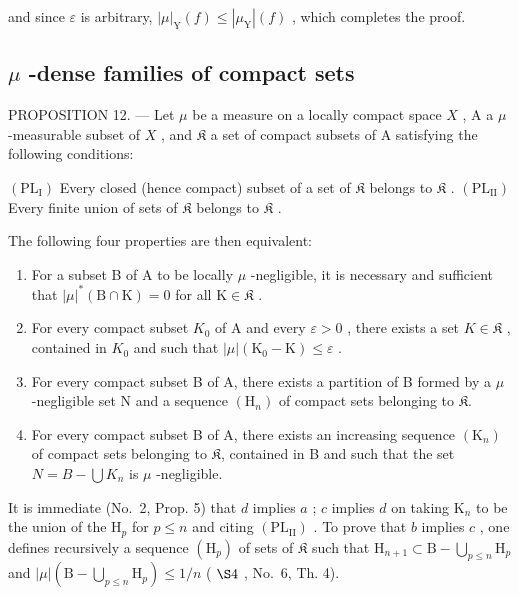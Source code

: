 and since \(\varepsilon\) is arbitrary, \(|\mu|_{\mathrm{Y}}(f) \leqslant |\mu_{\mathrm{Y}}|(f)\) , which completes the proof.

\subsection{\texorpdfstring{\(\mu\) -dense families of compact sets}{mu -dense families of compact sets}}

PROPOSITION 12. --- Let \(\mu\) be a measure on a locally compact space \(X\) , A a \(\mu\) -measurable subset of \(X\) , and \(\mathfrak{K}\) a set of compact subsets of A satisfying the following conditions:

\((\mathrm{PL}_{\mathrm{I}})\) Every closed (hence compact) subset of a set of \(\mathfrak{K}\) belongs to \(\mathfrak{K}\) . \((\mathrm{PL}_{\mathrm{II}})\) Every finite union of sets of \(\mathfrak{K}\) belongs to \(\mathfrak{K}\) .

The following four properties are then equivalent:

\begin{enumerate}
\def\labelenumi{\alph{enumi})}
\item
  For a subset B of A to be locally \(\mu\) -negligible, it is necessary and sufficient that \(|\mu|^*(\mathrm{B} \cap \mathrm{K}) = 0\) for all \(\mathrm{K} \in \mathfrak{K}\) .
\item
  For every compact subset \(K_{0}\) of A and every \(\varepsilon > 0\) , there exists a set \(K \in \mathfrak{K}\) , contained in \(K_{0}\) and such that \(|\mu|(\mathrm{K}_{0} - \mathrm{K}) \leqslant \varepsilon\) .
\item
  For every compact subset B of A, there exists a partition of B formed by a \(\mu\) -negligible set N and a sequence \((\mathrm{H}_{n})\) of compact sets belonging to \(\mathfrak{K}\).
\item
  For every compact subset B of A, there exists an increasing sequence \((\mathrm{K}_{n})\) of compact sets belonging to \(\mathfrak{K}\), contained in B and such that the set \(N = B - \bigcup K_{n}\) is \(\mu\) -negligible.
\end{enumerate}

It is immediate (No.~2, Prop. 5) that \(d\) implies \(a\) ; \(c\) implies \(d\) on taking \(\mathrm{K}_n\) to be the union of the \(\mathrm{H}_p\) for \(p \leqslant n\) and citing \((\mathrm{PL}_{\mathrm{II}})\) . To prove that \(b\) implies \(c\) , one defines recursively a sequence \((\mathrm{H}_p)\) of sets of \(\mathfrak{K}\) such that \(\mathrm{H}_{n+1} \subset \mathrm{B} - \bigcup_{p \leqslant n} \mathrm{H}_p\) and \(|\mu| (\mathrm{B} - \bigcup_{p \leqslant n} \mathrm{H}_p) \leqslant 1/n\) ( \(\S 4\) , No.~6, Th. 4).

